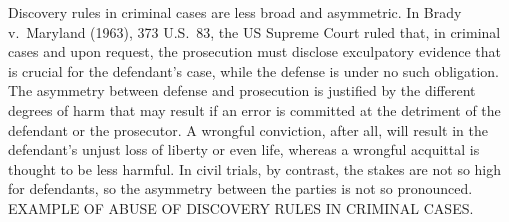\documentclass[10pt]{article}
\begin{document}

 
Discovery rules in criminal cases are less broad and asymmetric. 
In Brady v.\ Maryland (1963), 373 U.S.\ 83, the US Supreme Court ruled that, in criminal cases and upon request, the prosecution must 
disclose exculpatory evidence that is crucial for the defendant's case, while the defense is under no such obligation.
The asymmetry between defense and prosecution is justified by the different degrees of harm that may result if an error is committed at the detriment of the defendant or the prosecutor. A wrongful conviction, after all, will result  
in the defendant's unjust loss of liberty or even life, whereas a wrongful acquittal 
is thought to be less harmful. In civil trials, by contrast, the stakes are not so high for defendants, 
so the asymmetry between the parties is not so pronounced.
EXAMPLE OF ABUSE OF DISCOVERY RULES IN CRIMINAL CASES.

%
%
\end{document}
